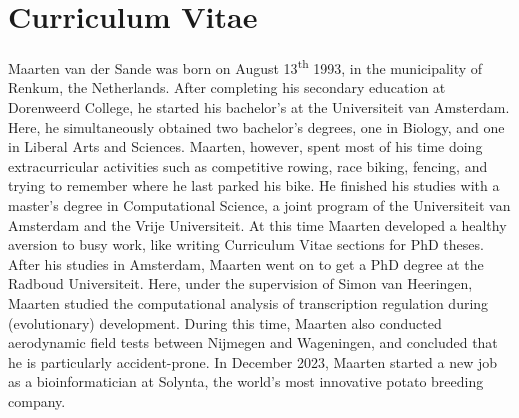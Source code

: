 \section{Curriculum Vitae}

Maarten van der Sande was born on August 13\textsuperscript{th} 1993, in the municipality of Renkum, the Netherlands. After completing his secondary education at Dorenweerd College, he started his bachelor's at the Universiteit van Amsterdam. Here, he simultaneously obtained two bachelor's degrees, one in Biology, and one in Liberal Arts and Sciences. Maarten, however, spent most of his time doing extracurricular activities such as competitive rowing, race biking, fencing, and trying to remember where he last parked his bike. He finished his studies with a master's degree in Computational Science, a joint program of the Universiteit van Amsterdam and the Vrije Universiteit. At this time Maarten developed a healthy aversion to busy work, like writing Curriculum Vitae sections for PhD theses. After his studies in Amsterdam, Maarten went on to get a PhD degree at the Radboud Universiteit. Here, under the supervision of Simon van Heeringen, Maarten studied the computational analysis of transcription regulation during (evolutionary) development. During this time, Maarten also conducted aerodynamic field tests between Nijmegen and Wageningen, and concluded that he is particularly accident-prone. In December 2023, Maarten started a new job as a bioinformatician at Solynta, the world's most innovative potato breeding company.
